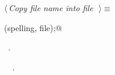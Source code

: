 \documentclass{report}
\begin{document}
\begin{flushleft} \small
\begin{minipage}{\linewidth} \label{scrap185}
$\langle\,${\it Copy file name into file}\nobreak\ {\footnotesize {}}$\,\rangle\equiv$
\vspace{-1ex}
\begin{list}{}{} \item
\mbox{}\verb@fputs(spelling, file);@\\
\mbox{}\verb@@{\NWsep}
\end{list}
\vspace{-1ex}
\footnotesize\addtolength{\baselineskip}{-1ex}
\begin{list}{}{\setlength{\itemsep}{-\parsep}\setlength{\itemindent}{-\leftmargin}}
\item \NWtxtMacroRefIn\ .
\end{list}
\vspace{-2ex}
\footnotesize\addtolength{\baselineskip}{-1ex}
\begin{list}{}{\setlength{\itemsep}{-\parsep}\setlength{\itemindent}{-\leftmargin}}
\item \NWtxtIdentsUsed\nobreak\  \verb@fputs@\nobreak\ .\end{list}
\end{minipage}\\[4ex]
\end{flushleft}
\end{document}
